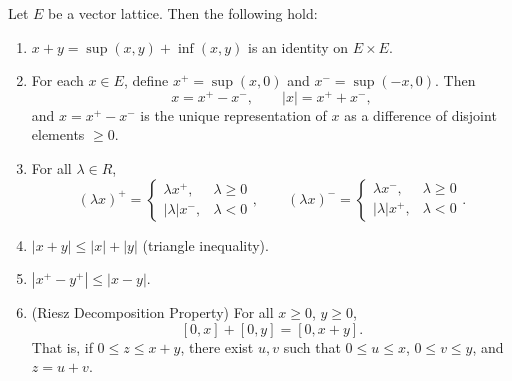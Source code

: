 Let $E$ be a vector lattice. Then the following hold:

\begin{enumerate}
\item[(3)] $x + y = \sup(x, y) + \inf(x, y)$ is an identity on $E \times E$.

\item For each $x \in E$, define $x^+ = \sup(x, 0)$ and $x^- = \sup(-x, 0)$. Then
$$x = x^+ - x^-, \qquad |x| = x^+ + x^-,$$
and $x = x^+ - x^-$ is the unique representation of $x$ as a difference of disjoint elements $\geq 0$.

\item[(4)] For all $\lambda \in R$,
$$(\lambda x)^+ = \begin{cases} \lambda x^+, & \lambda \geq 0 \\ |\lambda| x^-, & \lambda < 0 \end{cases}, \qquad
(\lambda x)^- = \begin{cases} \lambda x^-, & \lambda \geq 0 \\ |\lambda| x^+, & \lambda < 0 \end{cases}.$$

\item[(5)] $|x + y| \leq |x| + |y|$ (triangle inequality).

\item[(6)] $|x^+ - y^+| \leq |x - y|$.

\item[(D)] (Riesz Decomposition Property) For all $x \geq 0$, $y \geq 0$,
$$[0, x] + [0, y] = [0, x + y].$$
That is, if $0 \leq z \leq x + y$, there exist $u, v$ such that $0 \leq u \leq x$, $0 \leq v \leq y$, and $z = u + v$.
\end{enumerate}
